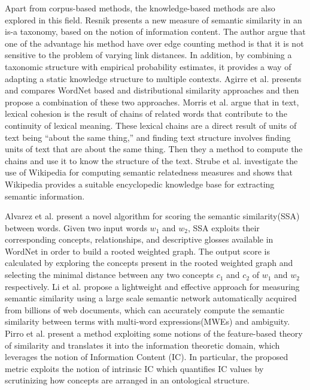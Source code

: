 Apart from corpus-based methods, the knowledge-based methods  
are also explored in this field.
Resnik \cite{Resnik:1995}presents a new measure of semantic similarity
in an is-a taxonomy, based on the notion of information content.
The author argue that one of the advantage his method have over edge counting 
method is that it is not sensitive to the problem of varying link distances. 
In addition, by combining a taxonomic structure with empirical
probability estimates, it provides a way of adapting
a static knowledge structure to multiple contexts.
Agirre et al. \cite{Agirre:2009} presents and compares WordNet based
and distributional similarity approaches and then propose a combination of 
these two approaches.
Morris et al. \cite{Morris:1991} argue that in text, lexical cohesion is the result of chains of related words that contribute to the continuity of lexical meaning.
These lexical chains are a direct result of units of text being ``about the
same thing,'' and finding text structure involves finding units of text that are about the same thing. Then they a method to compute the chains and use it to know the structure of the text.
Strube et al. \cite{Strube:2006}investigate the use of Wikipedia for computing
semantic relatedness measures and shows that Wikipedia provides a suitable
encyclopedic knowledge base for extracting semantic information.

Alvarez et al. \cite{Alvarez:2007} present a novel algorithm for scoring the semantic similarity(SSA) between words. Given two input words $w_1$ and $w_2$, SSA exploits their corresponding concepts, relationships, and descriptive glosses available in WordNet in order to build a rooted weighted graph. The output score is calculated by exploring the concepts present in the rooted weighted graph and selecting the minimal distance between any two concepts $c_1$ and $c_2$ of 
$w_1$ and $w_2$ respectively.
Li et al. \cite{Bollegala:2011}propose a lightweight and effective approach for measuring
semantic similarity using a large scale semantic network automatically
acquired from billions of web documents, which can accurately compute
the semantic similarity between terms with multi-word expressions(MWEs) and ambiguity.
Pirro et al. \cite{Pirro:2009} present a method exploiting some notions of the feature-based theory of similarity and translates it into the information theoretic domain, which leverages the notion of Information Content (IC). In particular, the proposed metric exploits the notion of intrinsic IC which quantifies IC values by scrutinizing how concepts are arranged in an ontological structure.
